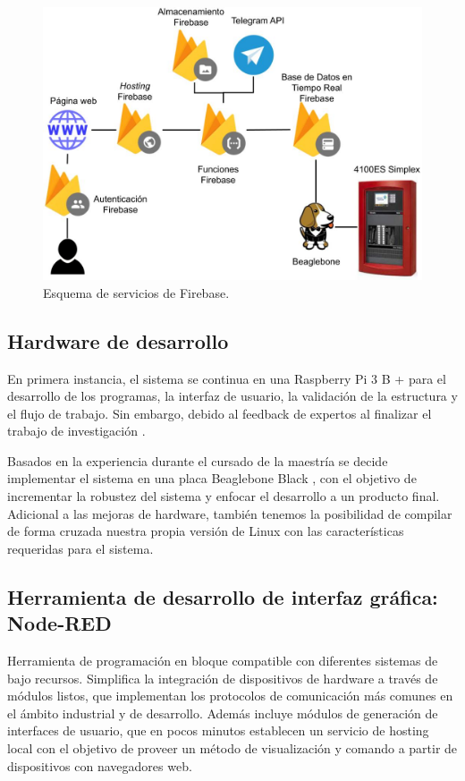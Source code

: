 \begin{figure}[ht]
   \centering
   \includegraphics[scale=.35]{./Figures/d_fbase.jpg}
   \caption{Esquema de servicios de Firebase.}
   \label{fig:d_fbase}
\end{figure}



\subsection{Hardware de desarrollo}

En primera instancia, el sistema se continua en una Raspberry Pi 3 B + para el desarrollo de los programas, la interfaz de usuario, la validación de la estructura y el flujo de trabajo. Sin embargo, debido al feedback de expertos al finalizar el trabajo de investigación \citep{cese}.

Basados en la experiencia durante el cursado de la maestría se decide implementar el sistema en una placa Beaglebone Black \citep{bbb}, con el objetivo de incrementar la robustez del sistema y enfocar el desarrollo a un producto final. Adicional a las mejoras de hardware, también tenemos la posibilidad de compilar de forma cruzada nuestra propia versión de Linux con las características requeridas para el sistema.

\subsection{Herramienta de desarrollo de interfaz gráfica: Node-RED}

Herramienta de programación en bloque compatible con diferentes sistemas de bajo recursos. Simplifica la integración de dispositivos de hardware a través de módulos listos, que implementan los protocolos de comunicación más comunes en el ámbito industrial y de desarrollo. Además incluye módulos de generación de interfaces de usuario, que en pocos minutos establecen un servicio de hosting local con el objetivo de proveer un método de visualización y comando a partir de dispositivos con navegadores web. 

